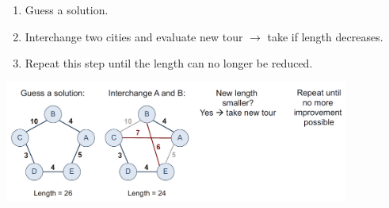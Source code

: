 \begin{enumerate}
    \item Guess a solution.
    \item Interchange two cities and evaluate new tour $\rightarrow$ take if length decreases.
    \item Repeat this step until the length can no longer be reduced.
\end{enumerate}

\begin{center}\includegraphics[width=0.85\textwidth]{img/approximation/TspLocalSearch.png}\end{center}

%

